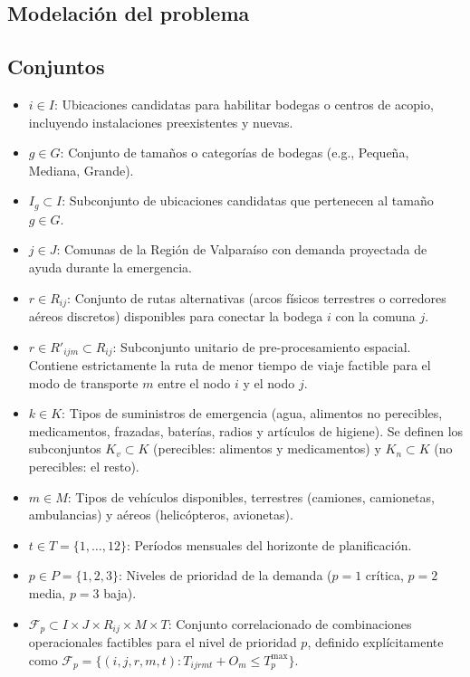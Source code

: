 \documentclass[letterpaper]{article}
\begin{document}
\begin{flushleft}
\section{Modelación del problema}

\subsection{Conjuntos}

\begin{itemize}[leftmargin=2em, itemsep=1pt]
  \item $i \in I$: Ubicaciones candidatas para habilitar bodegas o centros de acopio, incluyendo instalaciones preexistentes y nuevas.
  \item $g \in G$: Conjunto de tamaños o categorías de bodegas (e.g., Pequeña, Mediana, Grande).
  \item $I_g \subset I$: Subconjunto de ubicaciones candidatas que pertenecen al tamaño $g \in G$.
  \item $j \in J$: Comunas de la Región de Valparaíso con demanda proyectada de ayuda durante la emergencia.
  \item $r \in R_{ij}$: Conjunto de rutas alternativas (arcos físicos terrestres o corredores aéreos discretos) disponibles para conectar la bodega $i$ con la comuna $j$.
  \item $r \in R'_{ijm} \subset R_{ij}$: Subconjunto unitario de pre-procesamiento espacial. Contiene estrictamente la ruta de menor tiempo de viaje factible para el modo de transporte $m$ entre el nodo $i$ y el nodo $j$.
  \item $k \in K$: Tipos de suministros de emergencia (agua, alimentos no perecibles, medicamentos, frazadas, baterías, radios y artículos de higiene). Se definen los subconjuntos $K_v \subset K$ (perecibles: alimentos y medicamentos) y $K_n \subset K$ (no perecibles: el resto).
  \item $m \in M$: Tipos de vehículos disponibles, terrestres (camiones, camionetas, ambulancias) y aéreos (helicópteros, avionetas).
  \item $t \in T = \{1,\dots,12\}$: Períodos mensuales del horizonte de planificación.
  \item $p \in P = \{1,2,3\}$: Niveles de prioridad de la demanda ($p=1$ crítica, $p=2$ media, $p=3$ baja).
  \item $\mathcal{F}_p \subset I \times J \times R_{ij} \times M \times T$: Conjunto correlacionado de combinaciones operacionales factibles para el nivel de prioridad $p$, definido explícitamente como $\mathcal{F}_p = \{(i,j,r,m,t) : T_{ijrmt} + O_m \leq T^{\max}_p\}$.
\end{itemize}


\end{flushleft}
\end{document}
